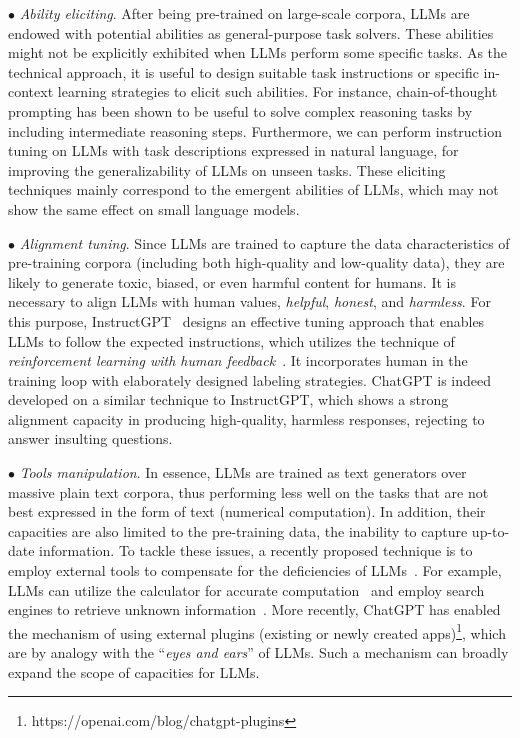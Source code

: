 $\bullet$ \emph{Ability eliciting}. After being pre-trained on large-scale corpora, LLMs are endowed with potential abilities as general-purpose task solvers. 
These abilities might not be explicitly exhibited when LLMs perform some specific  tasks. As the technical  approach, it is useful to design suitable task instructions or specific  in-context learning strategies to elicit such abilities.
For instance, chain-of-thought prompting has been shown to be useful to solve complex reasoning tasks by including intermediate reasoning steps.  
Furthermore, we can  perform instruction tuning on LLMs with task descriptions expressed in natural language, for improving  the generalizability  of LLMs on unseen tasks. 
These eliciting  techniques  mainly correspond to the emergent abilities of LLMs, which may not show the same effect on small language models. 


$\bullet$ \emph{Alignment tuning}. Since  LLMs are trained to capture the data characteristics of pre-training corpora (including both high-quality and low-quality data),  they are likely to generate toxic, biased, or even harmful content for humans. It is necessary to align LLMs with human values, \eg  \emph{helpful}, \emph{honest}, and \emph{harmless}. For this purpose, InstructGPT~\cite{Ouyang-arxiv-2022-Training} designs an effective tuning approach that enables LLMs to follow the expected instructions, which utilizes the technique of  \emph{reinforcement learning with human feedback}~\cite{Christiano-NeurIPS-2017-Deep,Ouyang-arxiv-2022-Training}.  It incorporates human in the training  loop with elaborately designed labeling strategies. 
ChatGPT is indeed developed on a similar technique to InstructGPT,  which shows a strong alignment capacity in producing high-quality, harmless responses, \eg rejecting to answer insulting questions. 


$\bullet$ \emph{Tools manipulation}. In essence, LLMs are trained as text generators over massive plain text corpora, thus performing less well on the tasks that are not best expressed in the form of text (\eg numerical computation). In addition, their capacities are also limited to the pre-training data, \eg the inability to capture up-to-date information. To tackle these issues, a recently proposed technique is to employ external tools to compensate for the deficiencies of LLMs~\cite{Schick-arxiv-2023-Toolformer,Nakano-arxiv-2021-WebGPT}. For example, LLMs can utilize the calculator for accurate computation~\cite{Schick-arxiv-2023-Toolformer} and employ search engines to retrieve unknown information~\cite{Nakano-arxiv-2021-WebGPT}. 
More recently, ChatGPT has enabled the mechanism of using external plugins (existing or newly created apps)\footnote{https://openai.com/blog/chatgpt-plugins}, which are by analogy with the ``\emph{eyes and ears}'' of LLMs.  Such a mechanism can broadly expand the scope of capacities for LLMs. 


